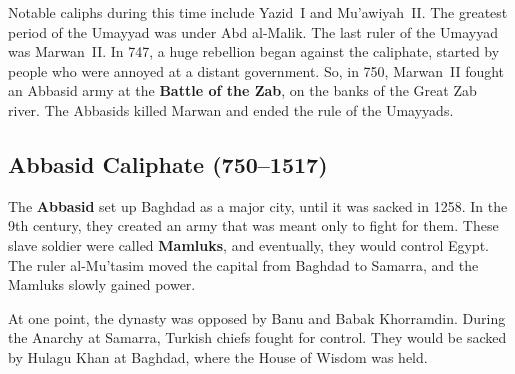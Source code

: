 Notable caliphs during this time include Yazid~I and Mu'awiyah~II\@.
The greatest period of the Umayyad was under Abd al-Malik.
The last ruler of the Umayyad was Marwan~II\@.
In 747, a huge rebellion began against the caliphate, started by people who were annoyed at a distant government.
So, in 750, Marwan~II fought an Abbasid army at the \textbf{Battle of the Zab},
on the banks of the Great Zab river.
The Abbasids killed Marwan and ended the rule of the Umayyads.

\subsection*{Abbasid Caliphate (750--1517)}

The \textbf{Abbasid} set up Baghdad as a major city, until it was sacked in 1258.
In the 9th century, they created an army that was meant only to fight for them.
These slave soldier were called \textbf{Mamluks}, and eventually, they would control Egypt.
The ruler al-Mu'tasim moved the capital from Baghdad to Samarra, and the Mamluks slowly gained power.

At one point, the dynasty was opposed by Banu and Babak Khorramdin.
During the Anarchy at Samarra, Turkish chiefs fought for control.
They would be sacked by Hulagu Khan at Baghdad, where the House of Wisdom was held.
